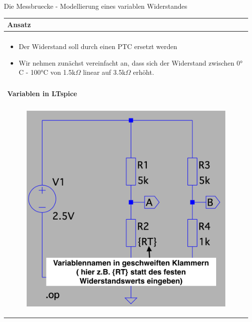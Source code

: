 \begin{frame}[t]{Die Messbruecke - Modellierung eines variablen Widerstandes}
    \begin{spacing}{0.9} \begin{tiny}
      \begin{table}[h!]
      \begin{tabular}{p{10cm}}
        \hline
        \textbf{Ansatz} \\
        \hline \\
        \begin{minipage}{\textwidth}
            \begin{itemize}
                \item Der Widerstand soll durch einen PTC ersetzt werden
                \item Wir nehmen zunächst vereinfacht an, dass sich der Widerstand zwischen 0$°$C - 100$°$C von 1.5k$\Omega$ linear auf 3.5k$\Omega$ erhöht. 
            \end{itemize}
        \end{minipage} 
        \\
        \\
        \hline
        \textbf{Variablen in LTspice} \\
        \hline \\
        \begin{minipage}{\textwidth}
            \begin{figure}
                \centering
                \includegraphics[width=0.45\linewidth]{pictures/rt_var.png}
            \end{figure}
        \end{minipage} 
        \\
      \end{tabular}

    \end{table}
     
    \end{tiny} \end{spacing}

\end{frame}

